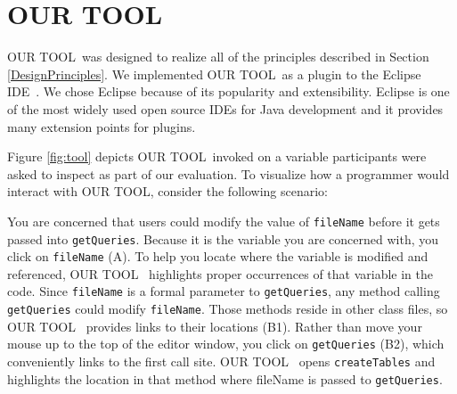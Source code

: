 \documentclass[conference]{IEEEtran}
\newcommand{\toolName}{OUR TOOL}
\begin{document}
\section{\toolName}
\toolName~was designed to realize all of the principles described in Section \ref{DesignPrinciples}. 
We implemented \toolName~as a plugin to the Eclipse IDE~\cite{Eclipse}. 
We chose Eclipse because of its popularity and extensibility. 
Eclipse is one of the most widely used open source IDEs for Java development and it provides many extension points for plugins. 

Figure \ref{fig:tool} depicts \toolName~invoked on a variable participants were asked to inspect as part of our evaluation. To visualize how a programmer would interact with \toolName, consider the following scenario:

You are concerned that users could modify the value of \texttt{fileName} before it gets passed into \texttt{getQueries}. 
Because it is the variable you are concerned with, you click on \texttt{fileName} (A). 
To help you locate where the variable is modified and referenced, \toolName~ highlights proper occurrences of that variable in the code.
Since \texttt{fileName} is a formal parameter to \texttt{getQueries}, any method calling \texttt{getQueries} could modify \texttt{fileName}. 
Those methods reside in other class files, so \toolName~ provides links to their locations (B1).
Rather than move your mouse up to the top of the editor window, you click on \texttt{getQueries} (B2), which conveniently links to the first call site. 
\toolName~ opens \texttt{createTables} and highlights the location in that method where fileName is passed to \texttt{getQueries}.

\end{document}
